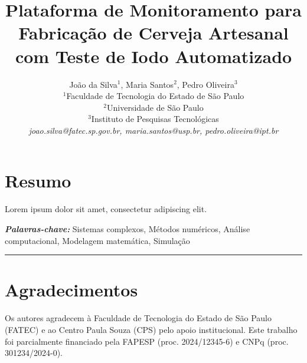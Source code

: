 \documentclass[11pt,a4paper]{article}
\title{\vspace{0.6cm}\textbf{\Large Plataforma de Monitoramento para Fabricação de Cerveja Artesanal com Teste de Iodo Automatizado}}
\author{
    João da Silva$^{1}$, Maria Santos$^{2}$, Pedro Oliveira$^{3}$ \\
    \small
    $^{1}$Faculdade de Tecnologia do Estado de São Paulo \\
    $^{2}$Universidade de São Paulo \\
    $^{3}$Instituto de Pesquisas Tecnológicas \\
    \textit{joao.silva@fatec.sp.gov.br, maria.santos@usp.br, pedro.oliveira@ipt.br}
}
\date{}
\begin{document}
\pagestyle{fancy}

\maketitle
\thispagestyle{fancy}

\section*{Resumo}
Lorem ipsum dolor sit amet, consectetur adipiscing elit. \lipsum[1]

\vspace{0.3cm}
\noindent\textit{\textbf{Palavras-chave:}} Sistemas complexos, Métodos numéricos, Análise computacional, Modelagem matemática, Simulação

\vspace{0.5cm}
\noindent\rule{\textwidth}{0.5pt}
\vspace{0.5cm}









\section*{Agradecimentos}
Os autores agradecem à Faculdade de Tecnologia do Estado de São Paulo (FATEC) e ao Centro Paula Souza (CPS) pelo apoio institucional. Este trabalho foi parcialmente financiado pela FAPESP (proc. 2024/12345-6) e CNPq (proc. 301234/2024-0).



\end{document}
